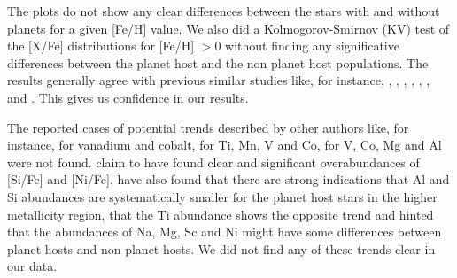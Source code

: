\documentclass[oldversion]{aa}
\begin{document}
The plots do not show any clear differences between the stars with and without planets for a given [Fe/H] value. We also did a Kolmogorov-Smirnov (KV) test of the [X/Fe] distributions for [Fe/H] $> 0$ without finding any significative differences between the planet host and the non planet host populations. The results generally agree with previous similar studies like, for instance, \citet{Gonzalez-2001}, \citet{Takeda-2001},  \citet{Sadakane-2002}, \citet{Bodaghee-2003}, \citet{Beirao-2005}, \citet{Fischer-2005}, \citet{Gilli-2006} and \citet{Takeda-2007}. This gives us confidence in our results. 

The reported cases of potential trends described by other authors like, for instance, \citet{Sadakane-2002} for vanadium and cobalt, \citet{Bodaghee-2003} for Ti, Mn, V and Co, \citet{Gilli-2006} for V, Co, Mg and Al were not found. \citet{Robinson-2006} claim to have found clear and significant overabundances of [Si/Fe] and [Ni/Fe]. %
\citet{Gonzalez-2007} have also found that there are strong indications that Al and Si abundances are systematically smaller for the planet host stars in the higher metallicity region, that the Ti abundance shows the opposite trend and hinted that the abundances of Na, Mg, Sc and Ni might have some differences between planet hosts and non planet hosts. We did not find any of these trends clear in our data. 



\end{document}
